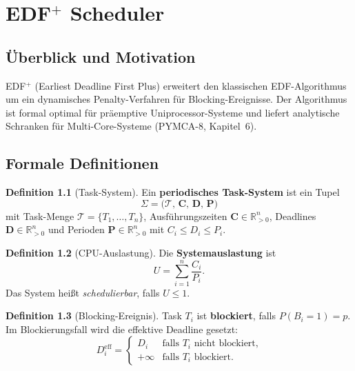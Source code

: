 ﻿\documentclass[a4paper,12pt]{scrreprt}
\theoremstyle{definition}
\newtheorem{definition}{Definition}[chapter]
\begin{document}
	\chapter{\texorpdfstring{EDF$^+$}{EDF+} Scheduler}
	
	\section{Überblick und Motivation}
	
	EDF$^+$ (Earliest Deadline First Plus) \cite{Epp2026edfplus} erweitert den
	klassischen EDF-Algorithmus \cite{Liu1973} um ein dynamisches
	Penalty-Verfahren für Blocking-Ereignisse. Der Algorithmus ist formal
	optimal für präemptive Uniprocessor-Systeme und liefert analytische
	Schranken für Multi-Core-Systeme (PYMCA-8, Kapitel~6).
	
	\section{Formale Definitionen}
	
	\begin{definition}[Task-System]
		Ein \textbf{periodisches Task-System} ist ein Tupel
		\[
		\Sigma = \bigl(\mathcal{T},\, \mathbf{C},\, \mathbf{D},\, \mathbf{P}\bigr)
		\]
		mit Task-Menge $\mathcal{T} = \{T_1, \ldots, T_n\}$,
		Ausführungszeiten $\mathbf{C} \in \mathbb{R}_{>0}^n$,
		Deadlines $\mathbf{D} \in \mathbb{R}_{>0}^n$ und
		Perioden $\mathbf{P} \in \mathbb{R}_{>0}^n$ mit $C_i \leq D_i \leq P_i$.
	\end{definition}
	
	\begin{definition}[CPU-Auslastung]
		Die \textbf{Systemauslastung} ist
		\[
		U = \sum_{i=1}^{n} \frac{C_i}{P_i}.
		\]
		Das System heißt \emph{schedulierbar}, falls $U \leq 1$.
	\end{definition}
	
	\begin{definition}[Blocking-Ereignis]
		Task $T_i$ ist \textbf{blockiert}, falls $P(B_i = 1) = p$. Im
		Blockierungsfall wird die effektive Deadline gesetzt:
		\[
		D_i^{\mathrm{eff}} = \begin{cases}
			D_i & \text{falls } T_i \text{ nicht blockiert,} \\
			+\infty & \text{falls } T_i \text{ blockiert.}
		\end{cases}
		\]
	\end{definition}
	
\end{document}
